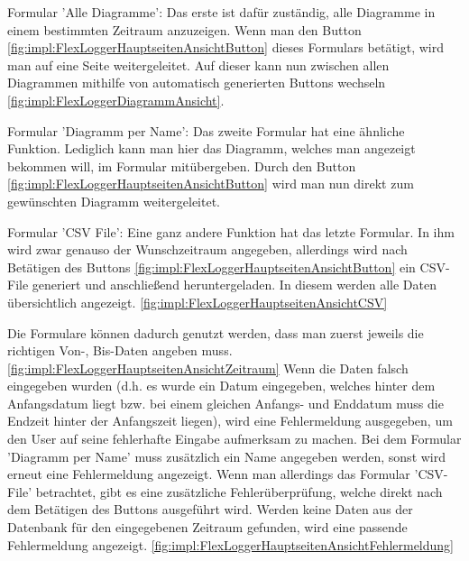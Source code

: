 \begin{compactitem}
    \item Formular 'Alle Diagramme': Das erste ist dafür zuständig, alle Diagramme in einem bestimmten Zeitraum anzuzeigen. Wenn man den Button \ref{fig:impl:FlexLoggerHauptseitenAnsichtButton} dieses Formulars betätigt, wird man auf eine Seite weitergeleitet. Auf dieser kann nun zwischen allen Diagrammen mithilfe von automatisch generierten Buttons wechseln \ref{fig:impl:FlexLoggerDiagrammAnsicht}. 
    \item Formular 'Diagramm per Name': Das zweite Formular hat eine ähnliche Funktion. Lediglich kann man hier das Diagramm, welches man angezeigt bekommen will, im Formular mitübergeben. Durch den Button \ref{fig:impl:FlexLoggerHauptseitenAnsichtButton} wird man nun direkt zum gewünschten Diagramm weitergeleitet. 
    \item Formular 'CSV File': Eine ganz andere Funktion hat das letzte Formular. In ihm wird zwar genauso der Wunschzeitraum angegeben, allerdings wird nach Betätigen des Buttons \ref{fig:impl:FlexLoggerHauptseitenAnsichtButton} ein CSV-File generiert und anschließend heruntergeladen. In diesem werden alle Daten übersichtlich angezeigt. \ref{fig:impl:FlexLoggerHauptseitenAnsichtCSV}
\end{compactitem}

Die Formulare können dadurch genutzt werden, dass man zuerst jeweils die richtigen Von-, Bis-Daten angeben muss. \ref{fig:impl:FlexLoggerHauptseitenAnsichtZeitraum} Wenn die Daten falsch eingegeben wurden (d.h. es wurde ein Datum eingegeben, welches hinter dem Anfangsdatum liegt bzw. bei einem gleichen Anfangs- und Enddatum muss die Endzeit hinter der Anfangszeit liegen), wird eine Fehlermeldung ausgegeben, um den User auf seine fehlerhafte Eingabe aufmerksam zu machen. Bei dem Formular 'Diagramm per Name' muss zusätzlich ein Name angegeben werden, sonst wird erneut eine Fehlermeldung angezeigt. Wenn man allerdings das Formular 'CSV-File' betrachtet, gibt es eine zusätzliche Fehlerüberprüfung, welche direkt nach dem Betätigen des Buttons ausgeführt wird. Werden keine Daten aus der Datenbank für den eingegebenen Zeitraum gefunden, wird eine passende Fehlermeldung angezeigt. \ref{fig:impl:FlexLoggerHauptseitenAnsichtFehlermeldung}

